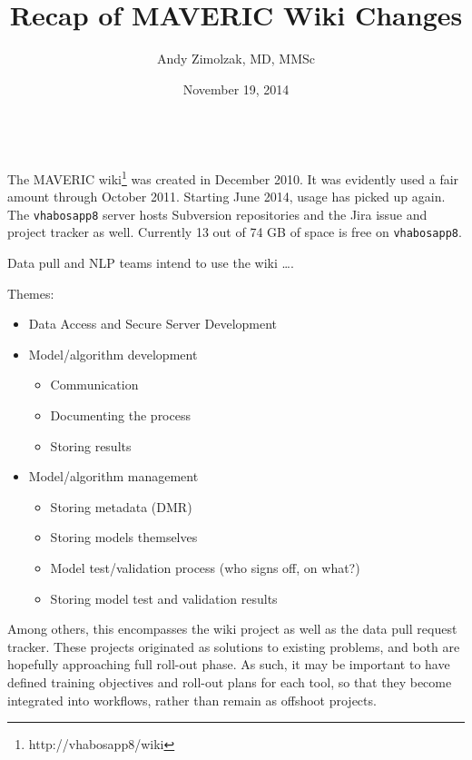 \documentclass{tufte-handout}
\title{Recap of MAVERIC Wiki Changes}
\author{Andy Zimolzak, MD, MMSc}
\date{November 19, 2014}
\begin{document}
\maketitle

~\\


The MAVERIC wiki\footnote{http://vhabosapp8/wiki} was created in December
2010. It was evidently used a fair amount through October 2011.
Starting June 2014, usage has picked up again. The \texttt{vhabosapp8} server
hosts Subversion repositories and the Jira issue and project tracker
as well. Currently 13 out of 74 GB of space is free on
\texttt{vhabosapp8}.

Data pull and NLP teams intend to use the wiki \ldots{}.

Themes:

\begin{itemize}
\item Data Access and Secure Server Development
\item Model/algorithm development

\begin{itemize}
\item Communication
\item Documenting the process
\item Storing results
\end{itemize}

\item Model/algorithm management

\begin{itemize}
\item Storing metadata (DMR)
\item Storing models themselves
\item Model test/validation process (who signs off, on what?)
\item Storing model test and validation results
\end{itemize}
\end{itemize}

Among others, this encompasses the wiki project as well as the data
pull request tracker. These projects originated as solutions to
existing problems, and both are hopefully approaching full roll-out
phase. As such, it may be important to have defined training
objectives and roll-out plans for each tool, so that they become
integrated into workflows, rather than remain as offshoot projects.
 
\end{document}
